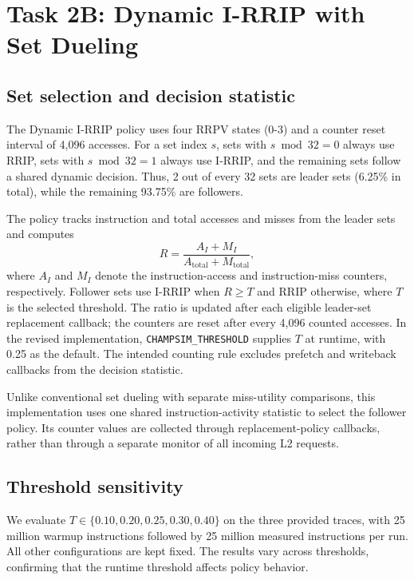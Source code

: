\section{Task 2B: Dynamic I-RRIP with Set Dueling}
\label{sec:task2b}

\subsection{Set selection and decision statistic}
The Dynamic I-RRIP policy uses four RRPV states (0-3) and a counter reset interval of 4,096 accesses. For a set index $s$, sets with $s\bmod 32=0$ always use RRIP, sets with $s\bmod 32=1$ always use I-RRIP, and the remaining sets follow a shared dynamic decision. Thus, 2 out of every 32 sets are leader sets (6.25\% in total), while the remaining 93.75\% are followers.

The policy tracks instruction and total accesses and misses from the leader sets and computes
\[
R=\frac{A_I+M_I}{A_{\mathrm{total}}+M_{\mathrm{total}}},
\]
where $A_I$ and $M_I$ denote the instruction-access and instruction-miss counters, respectively. Follower sets use I-RRIP when $R\geq T$ and RRIP otherwise, where $T$ is the selected threshold. The ratio is updated after each eligible leader-set replacement callback; the counters are reset after every 4,096 counted accesses. In the revised implementation, \texttt{CHAMPSIM\_THRESHOLD} supplies $T$ at runtime, with 0.25 as the default. The intended counting rule excludes prefetch and writeback callbacks from the decision statistic.

Unlike conventional set dueling with separate miss-utility comparisons, this implementation uses one shared instruction-activity statistic to select the follower policy. Its counter values are collected through replacement-policy callbacks, rather than through a separate monitor of all incoming L2 requests.

\subsection{Threshold sensitivity}
We evaluate $T\in\{0.10,0.20,0.25,0.30,0.40\}$ on the three provided traces, with 25 million warmup instructions followed by 25 million measured instructions per run. All other configurations are kept fixed. The results vary across thresholds, confirming that the runtime threshold affects policy behavior.

